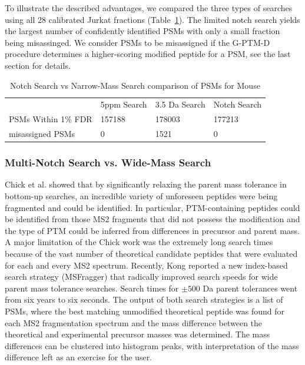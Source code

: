\documentclass[journal=jprobs,manuscript=article]{achemso}
\begin{document}
To illustrate the described advantages, we compared the three types of searches using all 28 calibrated Jurkat fractions (Table~\ref{tbl:singleVsMultiNotch}).
The limited notch search yields the largest number of confidently identified PSMs with only a small fraction being misassinged.
We consider PSMs to be misassigned if the G-PTM-D procedure determines a higher-scoring modified peptide for a PSM, see the last section for details.

\begin{table}[]
\centering
\caption{Notch Search vs Narrow-Mass Search comparison of PSMs for Mouse}
\label{tbl:singleVsMultiNotch}
\begin{tabular}{llll}
                    & 5ppm Search & 3.5 Da Search & Notch Search \\
PSMs Within 1\% FDR & 157188      & 178003        & 177213       \\
misassigned PSMs    & 0           & 1521          & 0            \\
\end{tabular}
\end{table}

\subsubsection{Multi-Notch Search vs. Wide-Mass Search}

Chick et al. showed that by significantly relaxing the parent mass tolerance in bottom-up searches, an incredible variety of unforeseen peptides were being fragmented and could be identified\citep{Chick_2015}.
In particular, PTM-containing peptides could be identified from those MS2 fragments that did not possess the modification and the type of PTM could be inferred from differences in precursor and parent mass.
A major limitation of the Chick work was the extremely long search times because of the vast number of theoretical candidate peptides that were evaluated for each and every MS2 spectrum.
Recently, Kong\citep{Kong_2017} reported a new index-based search strategy (MSFragger) that radically improved search speeds for wide parent mass tolerance searches.
Search times for $\pm 500$ Da parent tolerances went from six years to six seconds.
The output of both search strategies is a list of PSMs, where the best matching unmodified theoretical peptide was found for each MS2 fragmentation spectrum and the mass difference between the theoretical and experimental precursor masses was determined.
The mass differences can be clustered into histogram peaks\citep{Rodriguez_2014}, with interpretation of the mass difference left as an exercise for the user.
\end{document}
